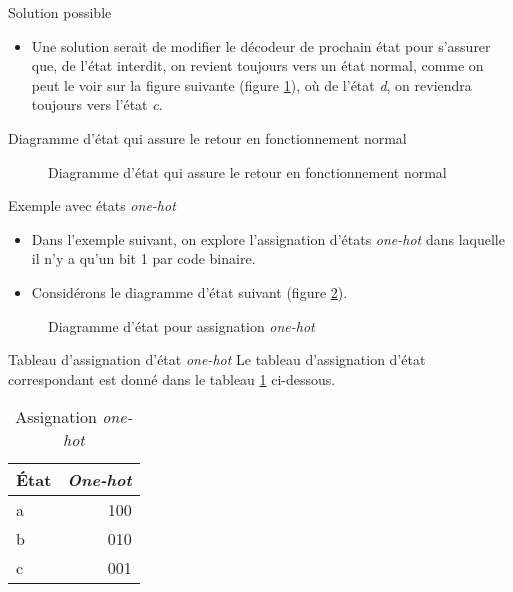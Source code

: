 \documentclass[presentation]{beamer}
\begin{document}
\begin{frame}[label={sec:org6e9c5c9}]{Solution possible}
\begin{itemize}
\item Une solution serait de modifier le décodeur de prochain état pour s'assurer que, de l'état interdit, on revient toujours vers un état normal, comme on peut le voir sur la figure suivante (figure \ref{fig:org80be735}), où de l'état \emph{d}, on reviendra toujours vers l'état \emph{c}.
\end{itemize}
\end{frame}

\begin{frame}[label={sec:orga0b7f4c}]{Diagramme d'état qui assure le retour en fonctionnement normal}
\begin{figure}[htbp]
\centering

\caption{\label{fig:org80be735}Diagramme d'état qui assure le retour en fonctionnement normal}
\end{figure}
\end{frame}

\begin{frame}[label={sec:org61f285e}]{Exemple avec états \emph{one-hot}}
\begin{itemize}
\item Dans l'exemple suivant, on explore l'assignation d'états \emph{one-hot} dans laquelle il n'y a qu'un bit 1 par code binaire.

\item Considérons le diagramme d'état suivant (figure \ref{fig:orgc871cb8}).
\end{itemize}

\begin{figure}[htbp]
\centering

\caption{\label{fig:orgc871cb8}Diagramme d'état pour assignation \emph{one-hot}}
\end{figure}
\end{frame}

\begin{frame}[label={sec:orgdf70187}]{Tableau d'assignation d'état \emph{one-hot}}
Le tableau d'assignation d'état correspondant est donné dans le
tableau \ref{tab:orga1bcabd} ci-dessous.

\begin{table}[htbp]
\caption{\label{tab:orga1bcabd}Assignation \emph{one-hot}}
\centering
\begin{tabular}{lr}
État & \emph{One-hot}\\[0pt]
\hline
a & 100\\[0pt]
b & 010\\[0pt]
c & 001\\[0pt]
\end{tabular}
\end{table}
\end{frame}
\end{document}
